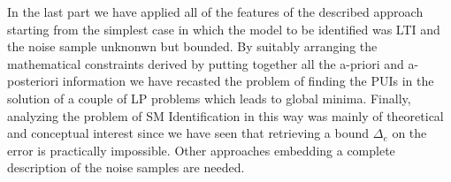 In the last part we have applied all of the features of the described approach starting from the simplest case in which the model to be identified was LTI and the noise sample unknonwn but bounded. By suitably arranging the mathematical constraints derived by putting together all the a-priori and a-posteriori information we have recasted the problem of finding the PUIs in the solution of a couple of LP problems which leads to global minima. Finally, analyzing the problem of SM Identification in this way was mainly of theoretical and conceptual interest since we have seen that retrieving a bound $\Delta_e$ on the error is practically impossible. Other approaches embedding a complete description of the noise samples are needed.


